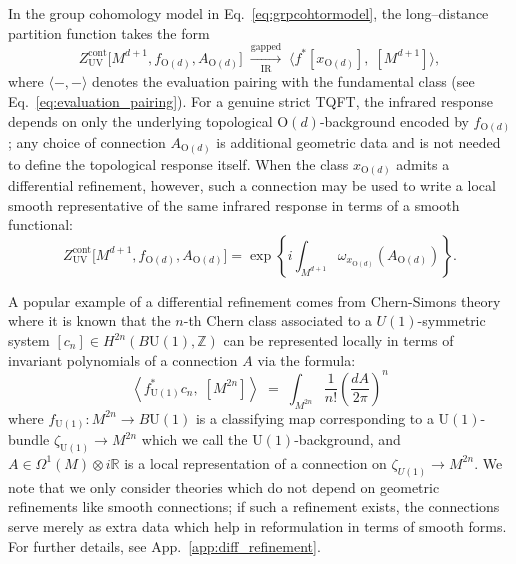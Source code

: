 \documentclass[aps,prx,reprint,superscriptaddress,twocolumn,amsmath,amssymb,amsfonts, nofootinbib]{revtex4-2}
\newcommand{\U}{\text{U}}
\newcommand{\Z}{\mathbb{Z}}
\theoremstyle{apsstyle}
\begin{document}
In the group cohomology model in Eq.~\ref{eq:grpcohtormodel}, the long–distance partition function takes the form
\begin{equation*}
    Z_{\mathrm{UV}}^{\mathrm{cont}}\bigl[M^{d+1}, f_{\mathrm{O}(d)}, A_{\mathrm{O}(d)}\bigr]
    \;\xrightarrow[\text{IR}]{\text{gapped}}\; 
    \big\langle f^{*}[x_{\mathrm{O}(d)}],\;[M^{d+1}] \big\rangle,
\end{equation*}
where $\langle -,-\rangle$ denotes the evaluation pairing with the fundamental class (see Eq.~\ref{eq:evaluation_pairing}).  For a genuine strict TQFT, the infrared response depends on only the underlying topological $\mathrm{O}(d)$-background encoded by $f_{\mathrm{O}(d)}$; any choice of connection $A_{\mathrm{O}(d)}$ is additional geometric data and is not needed to define the topological response itself. When the class $x_{\mathrm{O}(d)}$ admits a differential refinement, however, such a connection may be used to write a local smooth representative of the same infrared response in terms of a smooth functional: 
\begin{equation}
    Z_{\mathrm{UV}}^{\mathrm{cont}}\bigl[M^{d+1}, f_{\mathrm{O}(d)}, A_{\mathrm{O}(d)}\bigr]
    =\exp\left\{i\int_{M^{d+1}} \omega_{x_{\mathrm{O}(d)}}\left(A_{\mathrm{O}(d)}\right)\right\}.
    \label{eq:PF_continuum_IR}
\end{equation}


\bigskip 

A popular example of a differential refinement comes from Chern-Simons theory where it is known that the $n$-th Chern class associated to a $U(1)$-symmetric system $[c_{n}]\in H^{2n}(B\U(1), \Z)$ can be represented locally in terms of invariant polynomials of a connection $A$ via the formula:
\begin{equation*}
    \left\langle f_{\U(1)}^{*}c_{n},\; [M^{2n}]\right \rangle \; = \; \int_{M^{2n}}\dfrac{1}{n!} \left(\dfrac{dA}{2\pi}\right)^{n}
\end{equation*}
where $f_{\U(1)}: M^{2n}\to B\U(1)$ is a classifying map corresponding to a $\U(1)$-bundle $\zeta_{\U(1)}\to M^{2n}$ which we call the $\U(1)$-background, and $A\in \Omega^{1}(M)\otimes i\mathbb{R}$ is a local representation of a connection on $\zeta_{U(1)}\to M^{2n}$. We note that we only consider theories which do not depend on geometric refinements like smooth connections; if such a refinement exists, the connections serve merely as extra data which help in reformulation in terms of smooth forms. For further details, see App.~\ref{app:diff_refinement}.
\end{document}

